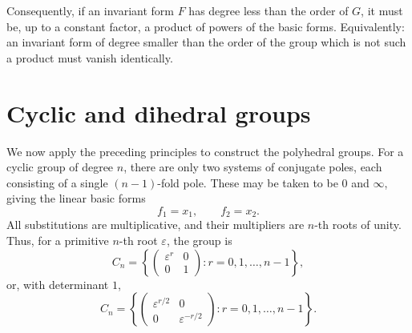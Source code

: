 \documentclass[11pt,a4paper]{book}
\begin{document}
Consequently, if an invariant form $F$ has degree less than the order of $G$, it must be, up to a constant factor, a product of powers of the basic forms.  Equivalently: an invariant form of degree smaller than the order of the group which is not such a product must vanish identically.

\section{Cyclic and dihedral groups}

We now apply the preceding principles to construct the polyhedral groups.  For a cyclic group of degree $n$, there are only two systems of conjugate poles, each consisting of a single $(n-1)$-fold pole.  These may be taken to be $0$ and $\infty$, giving the linear basic forms
\begin{equation}\label{eq:w9-cyc-basic}
 f_1=x_1,
 \qquad f_2=x_2.
\end{equation}
All substitutions are multiplicative, and their multipliers are $n$-th roots of unity.  Thus, for a primitive $n$-th root $\varepsilon$, the group is
\begin{equation}\label{eq:w9-Cn}
 C_n=\left\{
 \begin{pmatrix}\varepsilon^r&0\\0&1\end{pmatrix}
 :r=0,1,\ldots,n-1
 \right\},
\end{equation}
or, with determinant $1$,
\begin{equation}\label{eq:w9-Cn-det1}
 C_n=\left\{
 \begin{pmatrix}\varepsilon^{r/2}&0\\0&\varepsilon^{-r/2}\end{pmatrix}
 :r=0,1,\ldots,n-1
 \right\}.
\end{equation}
\end{document}
